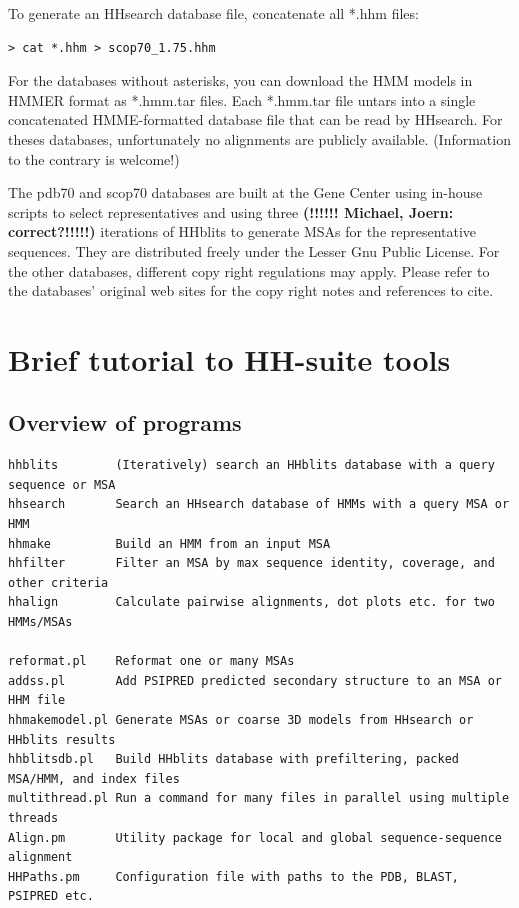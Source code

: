 \documentclass[11pt,a4paper]{article}
\begin{document}
To generate an HHsearch database file, concatenate all *.hhm files:
\begin{verbatim}
> cat *.hhm > scop70_1.75.hhm
\end{verbatim}
For the databases without asterisks, you can download the HMM models in HMMER format as 
*.hmm.tar files. Each *.hmm.tar file untars into a single concatenated HMME-formatted 
database file that can be read by HHsearch. For theses databases, unfortunately no 
alignments are publicly available. (Information to the contrary is welcome!) 

The pdb70 and scop70 databases are built at the Gene Center using in-house scripts 
to select representatives and using three {\bf (!!!!!! Michael, Joern: correct?!!!!!)}
iterations of HHblits to generate MSAs for the representative 
sequences. They are distributed freely under the Lesser Gnu Public License. 
For the other databases, different copy right regulations may apply. 
Please refer to the databases' original web sites for the copy right notes and references to 
cite.


\section{Brief tutorial to HH-suite tools}

\subsection{Overview of programs}

\small 
\begin{verbatim}
hhblits        (Iteratively) search an HHblits database with a query sequence or MSA
hhsearch       Search an HHsearch database of HMMs with a query MSA or HMM
hhmake         Build an HMM from an input MSA 
hhfilter       Filter an MSA by max sequence identity, coverage, and other criteria
hhalign        Calculate pairwise alignments, dot plots etc. for two HMMs/MSAs

reformat.pl    Reformat one or many MSAs
addss.pl       Add PSIPRED predicted secondary structure to an MSA or HHM file
hhmakemodel.pl Generate MSAs or coarse 3D models from HHsearch or HHblits results	
hhblitsdb.pl   Build HHblits database with prefiltering, packed MSA/HMM, and index files
multithread.pl Run a command for many files in parallel using multiple threads
Align.pm       Utility package for local and global sequence-sequence alignment
HHPaths.pm     Configuration file with paths to the PDB, BLAST, PSIPRED etc.
\end{verbatim} 
\normalsize
\end{document}

